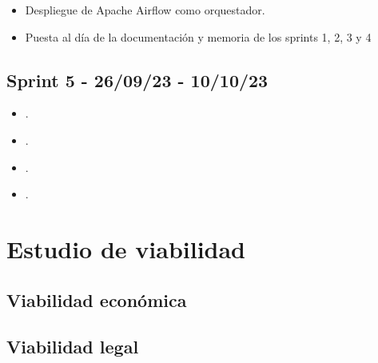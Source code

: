 \begin{itemize}
    \item Despliegue de Apache Airflow como orquestador.
    \item Puesta al día de la documentación y memoria de los sprints 1, 2, 3 y 4
\end{itemize}

\subsection{Sprint 5 -  26/09/23 - 10/10/23}

\begin{itemize}
    \item .
    \item .
    \item .
    \item .
\end{itemize}


\section{Estudio de viabilidad}

\subsection{Viabilidad económica}

\subsection{Viabilidad legal}


